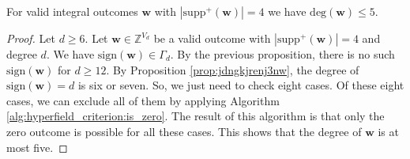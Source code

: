 \begin{theorem}\label{thm:main-result-32432432432nkdnjkfd}
    For valid integral outcomes \( \mathbf w \) with \( |\mathrm{supp}^+(\mathbf w)| = 4 \) we have \( \mathrm{deg}(\mathbf w) \leq 5 \).
\end{theorem}

\begin{proof}
    Let \( d \geq 6 \).
    Let \( \mathbf{w} \in \mathbb{Z}^{V_d} \) be a valid outcome with \( |\mathrm{supp}^+(\mathbf w)| = 4 \) and degree \( d \). We have \( \mathrm{sign}(\mathbf{w}) \in \Gamma_d \). By the previous proposition, there is no such \( \mathrm{sign}(\mathbf{w}) \) for \( d \geq 12 \). By Proposition \ref{prop:jdngkjrenj3nw}, the degree of \( \mathrm{sign}(\mathbf{w}) = d \) is six or seven. So, we just need to check eight cases. Of these eight cases, we can exclude all of them by applying Algorithm \ref{alg:hyperfield_criterion:is_zero}. The result of this algorithm is that only the zero outcome is possible for all these cases. This shows that the degree of \( \mathbf{w} \) is at most five.
\end{proof}